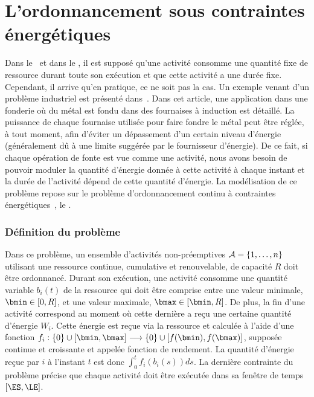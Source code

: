 
\section{L'ordonnancement sous contraintes énergétiques}
Dans le \RCPSP~et dans le \CUSP, il est supposé qu'une activité
consomme une quantité fixe de ressource durant toute son exécution et
que cette activité a une durée fixe. Cependant, il arrive qu'en
pratique, ce ne soit pas la cas. Un exemple venant d'un problème
industriel est présenté dans~\cite{HaitArtiguesLopez}. Dans cet
article, une application dans une fonderie où du métal est fondu dans
des fournaises à induction est détaillé. La puissance de chaque
fournaise utilisée pour faire fondre le métal peut être réglée, à tout
moment, afin d'éviter un dépassement d'un certain niveau d'énergie
(généralement dû à une limite suggérée par le fournisseur
d'énergie). De ce fait, si chaque opération de fonte est vue comme une
activité, nous avons besoin de pouvoir moduler la quantité d'énergie
donnée à cette activité à chaque instant et la durée de l'activité dépend de cette 
quantité d'énergie. La modélisation de ce problème repose sur le problème 
d'ordonnancement continu à contraintes énergétiques~\cite{ArtiguesLopez}, le
\CECSP. 

\subsubsection{Définition du problème}

Dans ce problème, un ensemble d'activités non-préemptives
${\cal A}=\{1,\dots,n\}$ utilisant une ressource continue, cumulative et
renouvelable, de capacité $R$ doit être ordonnancé. Durant son
exécution, une activité consomme une quantité variable $b_i(t)$ de la
ressource qui doit être comprise entre une valeur minimale, $\bmin \in
[0,R]$, et une valeur maximale, $\bmax \in [\bmin,R]$. De plus, la fin
d'une activité correspond au moment où cette dernière a reçu une
certaine quantité d'énergie $W_i$. Cette énergie est reçue via la
ressource et calculée à l'aide d'une fonction $f_i: \{0\} \cup
[\bmin,\bmax]\longrightarrow\{0\} \cup [f(\bmin),f(\bmax)]$, supposée
continue et croissante et appelée fonction de rendement. La quantité
d'énergie reçue par $i$ à l'instant $t$ est donc $\int_{0}^t
f_i(b_i(s))ds$. La dernière contrainte du problème précise que chaque activité doit
être exécutée dans sa fenêtre de temps $[\ES,\LE]$.


